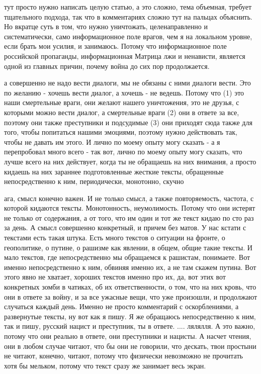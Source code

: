 тут просто нужно написать целую статью, а это сложно, тема объемная, требует
тщательного подхода, так что в комментариях сложно тут на пальцах объяснить. Но
вкратце суть в том, что нужно уничтожать, целенаправленно и систематически,
само информационное поле врагов, чем я на локальном уровне, если брать мои
усилия, и занимаюсь. Потому что информационное поле российской пропаганды,
информационная Матрица лжи и ненависти, является одной из главных причин,
почему война до сих пор продолжается.

а совершенно не надо вести диалоги, мы не обязаны с ними диалоги вести. Это по
желанию - хочешь вести диалог, а хочешь - не ведешь. Потому что (1) это наши
смертельные враги, они желают нашего уничтожения, это не друзья, с которыми
можно вести диалог, а смертельные враги (2) они в ответе за все, поэтому они
также преступники и подсудимые (3) они приходят сюда также для того, чтобы
попитаться нашими эмоциями, поэтому нужно действовать так, чтобы не давать им
этого. И лично по моему опыту могу сказать - а я перепробовал много всего - так
вот, лично по моему опыту могу сказать, что лучше всего на них действует, когда
ты не обращаешь на них внимания, а просто кидаешь на них зараннее
подготовленные жесткие тексты, обращенные непосредственно к ним, периодически,
монотонно, скучно

ага, смысл конечно важен. И не только смысл, а также повторяемость, частота, с
которой кидаются тексты. Монотонность, неумолимость. Потому что они истерят не
только от содержания, а от того, что им один и тот же текст кидаю по сто раз за
день. А смысл совершенно конкретный, и причем без матов. У нас кстати с
текстами есть такая штука. Есть много текстов о ситуации на фронте, о
геополитике, о путине, о рашизме как явлении, в общем, общие такие тексты. И
мало текстов, где непосредственно мы обращаемся к рашистам, понимаете. Вот
именно непосредственно к ним, обвиняя именно их, а не там скажем путина. Вот
этого явно не хватает, хороших текстов именно про их, да, вот этих вот
конкретных зомби в чатиках, об их ответственности, о том, что на них кровь, что
они в ответе за войну, и за все ужасные вещи, что уже произошли, и продолжают
случаться каждый день. Именно не просто комментарий с оскорблениями, а
развернутые тексты, ну вот как я пишу. Я же обращаюсь непосредственно к ним,
так и пишу, русский нацист и преступник, ты в ответе. .... лялялля. А это
важно, потому что они реально в ответе, они преступники и нацисты.  А насчет
чтения, они в любом случае читают, что бы они не говорили, что дескать, твои
простыни не читают, конечно, читают, потому что физически невозможно не
прочитать хотя бы мельком, потому что текст сразу же занимает весь экран.


